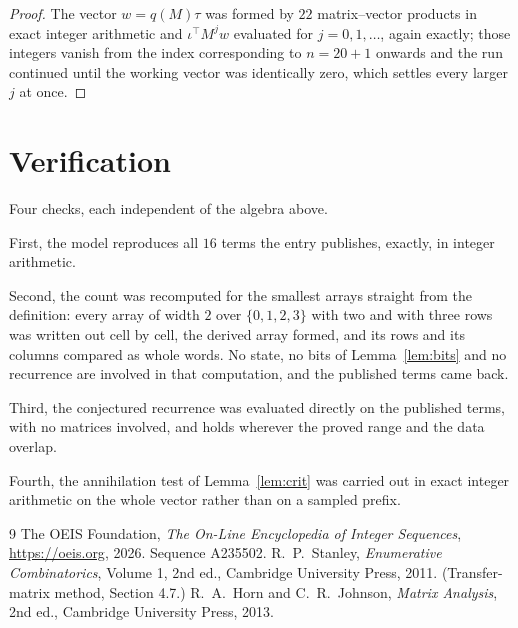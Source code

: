 \documentclass[11pt,a4paper]{article}
\theoremstyle{plain}
\theoremstyle{definition}
\begin{document}
\begin{proof}
The vector $w=q(M)\tau$ was formed by $22$ matrix--vector products in exact integer
arithmetic and $\iota^{\!\top}M^{j}w$ evaluated for $j=0,1,\dots$, again exactly; those
integers vanish from the index corresponding to $n=20+1$ onwards and the run continued
until the working vector was identically zero, which settles every larger $j$ at once.
\end{proof}

\section{Verification}

Four checks, each independent of the algebra above.

First, the model reproduces all $16$ terms the entry publishes, exactly, in integer
arithmetic.

Second, the count was recomputed for the smallest arrays straight from the definition: every
array of width $2$ over $\{0,1,2,3\}$ with two and with three rows was written out cell by cell,
the derived array formed, and its rows and its columns compared as whole words. No state, no
bits of Lemma~\ref{lem:bits} and no recurrence are involved in that computation, and the
published terms came back.

Third, the conjectured recurrence was evaluated directly on the published terms, with no
matrices involved, and holds wherever the proved range and the data overlap.

Fourth, the annihilation test of Lemma~\ref{lem:crit} was carried out in exact integer
arithmetic on the whole vector rather than on a sampled prefix.

\begin{thebibliography}{9}
 The OEIS Foundation, \emph{The On-Line Encyclopedia of Integer
Sequences}, \url{https://oeis.org}, 2026. Sequence A235502.
 R.~P.~Stanley, \emph{Enumerative Combinatorics}, Volume 1, 2nd ed.,
Cambridge University Press, 2011. (Transfer-matrix method, Section 4.7.)
 R.~A.~Horn and C.~R.~Johnson, \emph{Matrix Analysis}, 2nd ed., Cambridge
University Press, 2013.
\end{thebibliography}
\end{document}
